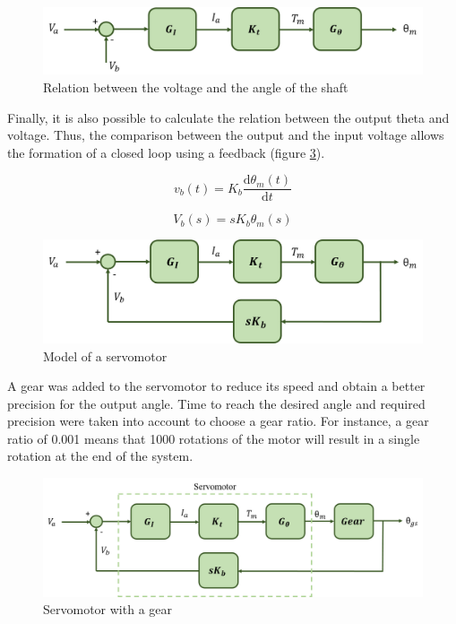 \begin{figure}[H]
\centering
\includegraphics[scale=0.6]{figures/model3.png}
\caption{Relation between the voltage and the angle of the shaft}
\label{model3}
\end{figure}

Finally, it is also possible to calculate the relation between the output theta and voltage. Thus, the comparison between the output and the input voltage allows the formation of a closed loop using a feedback (figure \ref{model4}).

\begin{equation}\label{feedback1}
v_{b}(t)= K_{b}\frac{\mathrm{d} \theta_{m}(t)}{\mathrm{d} t}
\end{equation}

\begin{equation}\label{feedback2}
V_{b}(s)= sK_{b}\theta_{m}(s)
\end{equation}

\begin{figure}[H]
\centering
\includegraphics[scale=0.6]{figures/model4.png}
\caption{Model of a servomotor}
\label{model4}
\end{figure}

A gear was added to the servomotor to reduce its speed and obtain a better precision for the output angle. Time to reach the desired angle and required precision were taken into account to choose a gear ratio.
For instance, a gear ratio of 0.001 means that 1000 rotations of the motor will result in a single rotation at the end of the system.

\begin{figure}[H]
\centering
\includegraphics[scale=0.6]{figures/servo+gear.png}
\caption{Servomotor with a gear}
\label{model4}
\end{figure}

